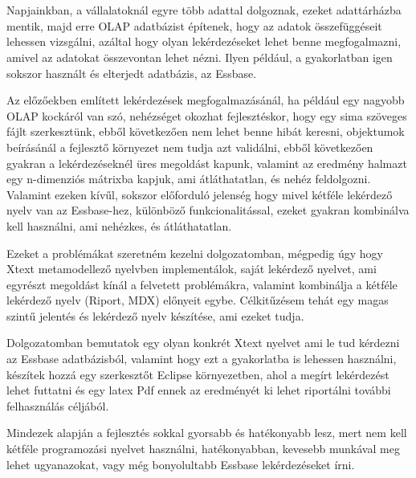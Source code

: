 \chapter*{\bevezeto}
Napjainkban, a vállalatoknál egyre több adattal dolgoznak, ezeket adattárházba mentik, 
majd erre OLAP adatbázist építenek, hogy az adatok összefüggéseit lehessen vizsgálni, 
azáltal hogy olyan lekérdezéseket lehet benne megfogalmazni, amivel az adatokat összevontan lehet nézni. 
Ilyen például, a gyakorlatban igen sokszor használt és elterjedt adatbázis, az Essbase.

Az előzőekben említett lekérdezések megfogalmazásánál, ha például egy nagyobb OLAP kockáról van szó, 
nehézséget okozhat fejlesztéskor, hogy egy sima szöveges fájlt szerkesztünk, 
ebből következően nem lehet benne hibát keresni, objektumok beírásánál a
fejlesztő környezet nem tudja azt validálni, ebből következően gyakran a
lekérdezéseknél üres megoldást kapunk, valamint az eredmény halmazt egy
n-dimenziós mátrixba kapjuk, ami átláthatatlan, és nehéz feldolgozni. Valamint
ezeken kívűl, sokszor előforduló jelenség hogy mivel kétféle lekérdező nyelv van
az Essbase-hez, különböző funkcionalitással, ezeket gyakran kombinálva kell
használni, ami nehézkes, és átláthatatlan.

Ezeket a problémákat szeretném kezelni dolgozatomban, mégpedig úgy hogy Xtext
metamodellező nyelvben implementálok, saját lekérdező nyelvet, ami egyrészt
megoldást kínál a felvetett problémákra, valamint kombinálja a kétféle lekérdező
nyelv (Riport, MDX) előnyeit egybe. Célkitűzésem tehát egy magas szintű jelentés
és lekérdező nyelv készítése, ami ezeket tudja.

Dolgozatomban bemutatok egy olyan konkrét Xtext nyelvet ami le tud kérdezni az
Essbase adatbázisból, valamint hogy ezt a gyakorlatba is lehessen használni,
készítek hozzá egy szerkesztőt Eclipse környezetben, ahol a megírt lekérdezést
lehet futtatni és egy latex Pdf ennek az eredményét ki lehet riportálni további
felhasználás céljából.

Mindezek alapján a fejlesztés sokkal gyorsabb és hatékonyabb lesz, mert nem kell
kétféle programozási nyelvet használni, hatékonyabban, kevesebb munkával meg
lehet ugyanazokat, vagy még bonyolultabb Essbase lekérdezéseket írni.


 
